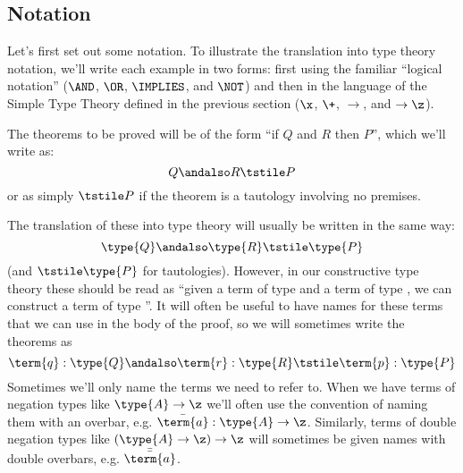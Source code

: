 %



\subsection{Notation}
\label{sec:DoingLogic-Notation}

Let's first set out some notation.  To illustrate the translation into type theory notation, we'll write each example in two forms: first using the familiar ``logical notation'' ($\AND$, $\OR$, $\IMPLIES$, and $\NOT$) and then in the language of the Simple Type Theory defined in the previous section ($\x$, $\+$, $\to$, and $\to \z$).

\begin{samepage}
The theorems to be proved will be of the form ``if $Q$ and $R$ then $P$'', which we'll write as:
\[
Q\andalso R \tstile P
\]
or as simply $\tstile P$ if the theorem is a tautology involving no premises.
\end{samepage}

The translation of these into type theory will usually be written in the same way:
\[
\type{Q}\andalso \type{R} \tstile \type{P}
\] 
(and $\tstile \type{P}$ for tautologies).  However, in our constructive type theory these should be read as ``given a term of type  and a term of type , we can construct a term of type ''.  It will often be useful to have names for these terms that we can use in the body of the proof, so we will sometimes write the theorems as
\[
\term{q}:\type{Q}\andalso \term{r}:\type{R} \tstile \term{p}:\type{P}
\] 
Sometimes we'll only name the terms we need to refer to.  When we have terms of negation types like $\type{A} \to \z$ we'll often use the convention of naming them with an overbar, e.g. 
$\bar{\term{a}}: \type{A} \to \z$.  Similarly, terms of double negation types like 
$(\type{A} \to \z) \to \z$ will sometimes be given names with double overbars, e.g. $\bar{\bar{\term{a}}}$.

